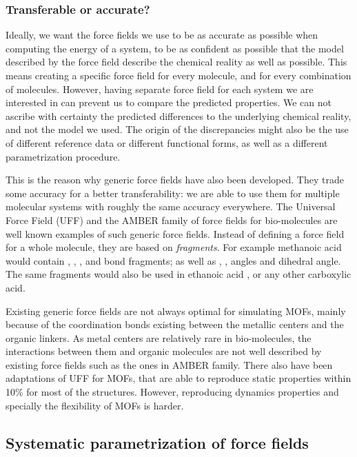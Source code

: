 \documentclass[thesis]{subfiles}
\begin{document}
\subsubsection{Transferable or accurate?}

Ideally, we want the force fields we use to be as accurate as possible when
computing the energy of a system, to be as confident as possible that the model
described by the force field describe the chemical reality as well as possible.
This means creating a specific force field for every molecule, and for every
combination of molecules. However, having separate force field for each system
we are interested in can prevent us to compare the predicted properties. We can
not ascribe with certainty the predicted differences to the underlying chemical
reality, and not the model we used. The origin of the discrepancies might also
be the use of different reference data or different functional forms, as well as
a different parametrization procedure.

This is the reason why generic force fields have also been developed. They
trade some accuracy for a better transferability: we are able to use them for
multiple molecular systems with roughly the same accuracy everywhere. The
Universal Force Field\cite{Rappe1992} (UFF) and the AMBER family\cite{Wang2004}
of force fields for bio-molecules are well known examples of such generic force
fields. Instead of defining a force field for a whole molecule, they are based
on \emph{fragments}. For example methanoic acid  would contain
, , , and  bond fragments; as well as
, ,  angles and  dihedral angle. The
same fragments would also be used in ethanoic acid , or any other
carboxylic acid.

Existing generic force fields are not always optimal for simulating MOFs, mainly
because of the coordination bonds existing between the metallic centers and the
organic linkers. As metal centers are relatively rare in bio-molecules, the
interactions between them and organic molecules are not well described by
existing force fields such as the ones in AMBER family. There also have been
adaptations of UFF for MOFs\cite{Addicoat2014, Coupry2016}, that are able to
reproduce static properties within 10\% for most of the structures. However,
reproducing dynamics properties and specially the flexibility of MOFs is harder.

\subsection{Systematic parametrization of force fields}
\end{document}
